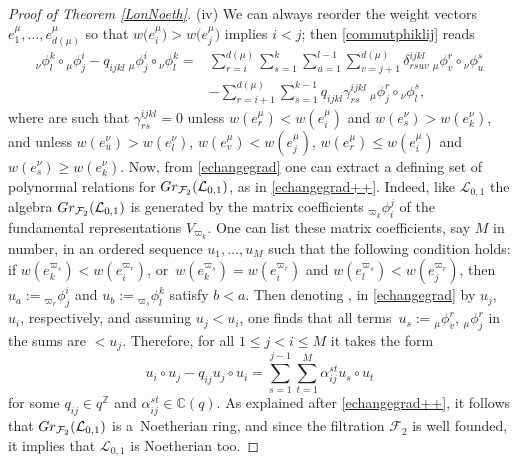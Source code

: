 \documentclass[11pt]{article}
\numberwithin{equation}{section}
\numberwithin{equation}{section}
\theoremstyle{definition}
\newcommand{\mc}{\mathbb{C}}
\newcommand{\mz}{\mathbb{Z}}
\newcommand{\Ll}{{\mathcal L}}
\begin{document}
\begin{proof}[Proof of Theorem \ref{LonNoeth}]
(iv) We can always reorder the weight vectors $e_1^\mu,\dots,e_{d(\mu)}^\mu$ so that $w\big(e_i^\mu\big) > w\big(e_j^\mu\big)$ implies $i < j$; then \eqref{commutphiklij} reads
\begin{align}
{}_{{\nu}}\phi^k_l \circ {}_{{\mu}}\phi^i_j - q_{ijkl} \ {}_{{\mu}}\phi^i_j\circ {}_{{\nu}}\phi^k_l ={}& \sum_{r=i}^{d(\mu)}\sum_{s=1}^k \sum_{u=1}^{l-1} \sum_{v=j+1}^{d(\mu)} \delta^{ijkl}_{rsuv} \ {}_{\mu}\phi^r_v \circ {}_{{\nu}}\phi^s_u \nonumber\\
 & - \sum_{r=i+1}^{d(\mu)}\sum_{s=1}^{k-1} q_{ijkl}\gamma_{rs}^{ijkl} \ {}_{\mu}\phi^r_j \circ {}_{{\nu}}\phi^s_l, \label{echangegrad}
\end{align}
where \smash{$\gamma_{rs}^{ijkl}, \delta^{ijkl}_{rsuv}\in \mc(q)$} are such that $\gamma_{rs}^{ijkl}=0$ unless $w(e_r^\mu) < w(e_i^\mu)$ and $w(e_s^\nu) > w(e_k^\nu)$, and  unless $w(e_u^\nu) > w(e_l^\nu)$, $w(e_v^\mu) < w(e_j^\mu)$, $w(e_r^\mu) \leq w(e_i^\mu)$ and $w(e_s^\nu) \geq w(e_k^\nu)$. Now, from \eqref{echangegrad} one can extract a defining set of polynormal relations for $ {\rm Gr}_{{\mathcal F}_2}({\mathcal L}_{0,1})$, as in \eqref{echangegrad++}. Indeed, like ${\mathcal L}_{0,1}$ the algebra $ {\rm Gr}_{{\mathcal F}_2}({\mathcal L}_{0,1})$ is generated by the matrix coefficients ${}_{{\varpi_k}} \phi_i^j$ of the fundamental representations $V_{\varpi_k}$. One can list these matrix coefficients, say $M$ in number, in an ordered sequence $u_1,\dots,u_M$ such that the following condition holds: if $w(e_k^{\varpi_s}) < w(e_i^{\varpi_r})$, or~${w(e_k^{\varpi_s}) = w(e_i^{\varpi_r})}$ and $w(e_l^{\varpi_s}) < w(e_j^{\varpi_r})$, then $u_a:={}_{{\varpi_r}} \phi^i_j$ and $u_b:={}_{{\varpi_s}} \phi^k_l$ satisfy $b<a$. Then denoting ,  in \eqref{echangegrad} by $u_j$, $u_i$, respectively, and assuming $u_j<u_i$, one finds that all terms~${u_s:= {}_{\mu}\phi^r_v}$, ${}_{\mu}\phi^r_j$ in the sums are $< u_j$. Therefore, for all $1\leq j<i\leq M$ it takes the form
\begin{equation}\label{echangegrad+}
u_i\circ u_j - q_{ij} u_j\circ u_i = \sum_{s=1}^{j-1}\sum_{t=1}^M \alpha_{ij}^{st} u_s\circ u_t
\end{equation}
for some $q_{ij}\in q^{\mz}$ and $\alpha_{ij}^{st}\in \mc(q)$. As explained after \eqref{echangegrad++}, it follows that $ {\rm Gr}_{{\mathcal F}_2}({\mathcal L}_{0,1})$ is a~Noetherian ring, and since the filtration $\mathcal{F}_2$ is well founded, it implies that $\Ll_{0,1}$ is Noetherian too.


\end{proof}
\end{document}

